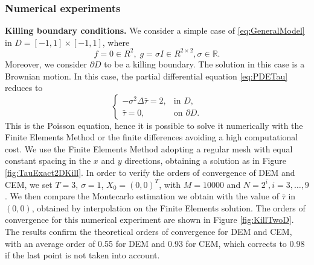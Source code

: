 \subsubsection{Numerical experiments}

\textbf{Killing boundary conditions.} We consider a simple case of \eqref{eq:GeneralModel} in $D = [-1,1] \times [-1,1]$, where
\begin{equation*}
	f = 0 \in R^2, \; g = \sigma I\in R^{2\times 2}, \sigma \in \mathbb{R}.
\end{equation*}
Moreover, we consider $\partial D$ to be a killing boundary. The solution in this case is a Brownian motion. In this case, the partial differential equation \eqref{eq:PDETau} reduces to
\begin{equation}\label{eq:PDETau2DKilling}
\begin{cases}
	- \sigma^2 \Delta \bar \tau = 2, & \text{in } D, \\
	\bar \tau = 0, & \text{on } \partial D.
\end{cases}
\end{equation}
This is the Poisson equation, hence it is possible to solve it numerically with the Finite Elements Method or the finite differences avoiding a high computational cost. We use the Finite Elements Method adopting a regular mesh with equal constant spacing in the $x$ and $y$ directions, obtaining a solution as in Figure \ref{fig:TauExact2DKill}. In order to verify the orders of convergence of DEM and CEM, we set $T = 3$, $\sigma = 1$, $X_0 = (0,0)^T$, with $M = 10000$ and $N = 2^i,i=3,\dots,9$. We then compare the Montecarlo estimation we obtain with the value of $\bar\tau$ in $(0,0)$, obtained by interpolation on the Finite Elements solution. The orders of convergence for this numerical experiment are shown in Figure \ref{fig:KillTwoD}. The results confirm the theoretical orders of convergence for DEM and CEM, with an average order of 0.55 for DEM and 0.93 for CEM, which corrects to 0.98 if the last point is not taken into account.

